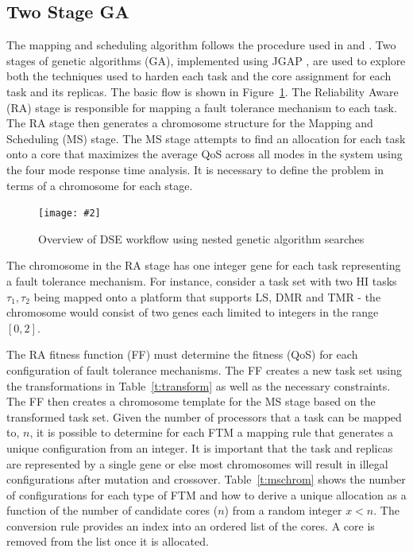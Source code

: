 \documentclass[conference]{IEEEtran}
\newcommand{\addfigure}[4]{
\begin{figure}[fh]
	\centering
	\texttt{[image: \#2]}
	\caption{#3}
	\label{#4}
\end{figure}
}
\begin{document}
\subsection{Two Stage GA}
	The mapping and scheduling algorithm follows the procedure used in \cite{bolchini2013reliability} and \cite{kang2014reliability}. 
	Two stages of genetic algorithms (GA), implemented using JGAP \cite{jgap}, are used to explore both the techniques used to harden each task and the core assignment for each task and its replicas. 
	The basic flow is shown in Figure~\ref{f:dse}. 
	The Reliability Aware (RA) stage is responsible for mapping a fault tolerance mechanism to each task. 
	The RA stage then generates a chromosome structure for the Mapping and Scheduling (MS) stage. 
	The MS stage attempts to find an allocation for each task onto a core that maximizes the average QoS across all modes in the system using the four mode response time analysis.
	It is necessary to define the problem in terms of a chromosome for each stage.
	
\addfigure{0.6}{dse.pdf}{Overview of DSE workflow using nested genetic algorithm searches}{f:dse}
	
	The chromosome in the RA stage has one integer gene for each task representing a fault tolerance mechanism. 
	For instance, consider a task set with two HI tasks ${\tau_1,\tau_2}$ being mapped onto a platform that supports LS, DMR and TMR - the chromosome would consist of two genes each limited to integers in the range $[0,2]$. 
	
	The RA fitness function (FF) must determine the fitness (QoS) for each configuration of fault tolerance mechanisms. 
	The FF creates a new task set using the transformations in Table~\ref{t:transform} as well as the necessary constraints. 
	The FF then creates a chromosome template for the MS stage based on the transformed task set. 
	Given the number of processors that a task can be mapped to, $n$, it is possible to determine for each FTM a mapping rule that generates a unique configuration from an integer. 
	It is important that the task and replicas are represented by a single gene or else most chromosomes will result in illegal configurations after mutation and crossover. 
	Table~\ref{t:mschrom} shows the number of configurations for each type of FTM and how to derive a unique allocation as a function of the number of candidate cores ($n$) from a random integer $x < n$. 
	The conversion rule provides an index into an ordered list of the cores. A core is removed from the list once it is allocated.
	
\end{document}
